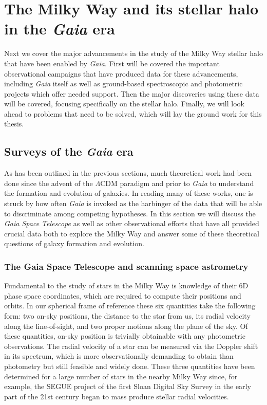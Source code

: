 
\section{The Milky Way and its stellar halo in the \textit{Gaia} era}

Next we cover the major advancements in the study of the Milky Way stellar halo that have been enabled by \textit{Gaia}. First will be covered the important observational campaigns that have produced data for these advancements, including \textit{Gaia} itself as well as ground-based spectroscopic and photometric projects which offer needed support. Then the major discoveries using these data will be covered, focusing specifically on the stellar halo. Finally, we will look ahead to problems that need to be solved, which will lay the ground work for this thesis.

\subsection{Surveys of the \textit{Gaia} era}

As has been outlined in the previous sections, much theoretical work had been done since the advent of the $\Lambda$CDM paradigm and prior to \textit{Gaia} to understand the formation and evolution of galaxies. In reading many of these works, one is struck by how often \textit{Gaia} is invoked as the harbinger of the data that will be able to discriminate among competing hypotheses. In this section we will discuss the \textit{Gaia Space Telescope} as well as other observational efforts that have all provided crucial data both to explore the Milky Way and answer some of these theoretical questions of galaxy formation and evolution.

\subsubsection{The Gaia Space Telescope and scanning space astrometry}

Fundamental to the study of stars in the Milky Way is knowledge of their 6D phase space coordinates, which are required to compute their positions and orbits. In our spherical frame of reference these six quantities take the following form: two on-sky positions, the distance to the star from us, its radial velocity along the line-of-sight, and two proper motions along the plane of the sky. Of these quantities, on-sky position is trivially obtainable with any photometric observations. The radial velocity of a star can be measured via the Doppler shift in its spectrum, which is more observationally demanding to obtain than photometry but still feasible and widely done. These three quantities have been determined for a large number of stars in the nearby Milky Way since, for example, the SEGUE project \parencite{segue} of the first Sloan Digital Sky Survey \parencite[SDSS][]{sdss} in the early part of the 21st century began to mass produce stellar radial velocities.

